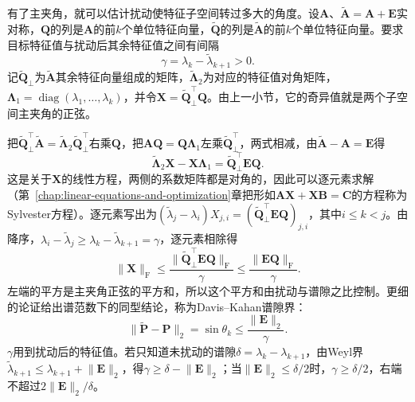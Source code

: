 有了主夹角，就可以估计扰动使特征子空间转过多大的角度。设$\bm A$、$\widetilde{\bm A}=\bm A+\bm E$实对称，$\bm Q$的列是$\bm A$的前$k$个单位特征向量，$\widetilde{\bm Q}$的列是$\widetilde{\bm A}$的前$k$个单位特征向量。要求目标特征值与扰动后其余特征值之间有间隔
\[
 \gamma=\lambda_k-\widetilde\lambda_{k+1}>0 .
\]
记$\widetilde{\bm Q}_\perp$为$\widetilde{\bm A}$其余特征向量组成的矩阵，$\widetilde{\bm\Lambda}_2$为对应的特征值对角矩阵，$\bm\Lambda_1=\operatorname{diag}(\lambda_1,\ldots,\lambda_k)$，并令$\bm X=\widetilde{\bm Q}_\perp^\top\bm Q$。由上一小节，它的奇异值就是两个子空间主夹角的正弦。

把$\widetilde{\bm Q}_\perp^\top\widetilde{\bm A}=\widetilde{\bm\Lambda}_2\widetilde{\bm Q}_\perp^\top$右乘$\bm Q$，把$\bm A\bm Q=\bm Q\bm\Lambda_1$左乘$\widetilde{\bm Q}_\perp^\top$，两式相减，由$\widetilde{\bm A}-\bm A=\bm E$得
\[
 \widetilde{\bm\Lambda}_2\bm X-\bm X\bm\Lambda_1=\widetilde{\bm Q}_\perp^\top\bm E\bm Q .
\]
这是关于$\bm X$的线性方程，两侧的系数矩阵都是对角的，因此可以逐元素求解（第~\ref{chap:linear-equations-and-optimization}章把形如$\bm A\bm X+\bm X\bm B=\bm C$的方程称为Sylvester方程）。逐元素写出为$(\widetilde\lambda_j-\lambda_i)X_{j,i}=(\widetilde{\bm Q}_\perp^\top\bm E\bm Q)_{j,i}$，其中$i\leq k<j$。由降序，$\lambda_i-\widetilde\lambda_j\geq\lambda_k-\widetilde\lambda_{k+1}=\gamma$，逐元素相除得
\[
 \lVert\bm X\rVert_{\mathrm F}\leq\frac{\lVert\widetilde{\bm Q}_\perp^\top\bm E\bm Q\rVert_{\mathrm F}}{\gamma}\leq\frac{\lVert\bm E\bm Q\rVert_{\mathrm F}}{\gamma}.
\]
左端的平方是主夹角正弦的平方和，所以这个平方和由扰动与谱隙之比控制。更细的论证给出谱范数下的同型结论，称为Davis--Kahan谱隙界：
\begin{equation}
 \lVert\widetilde{\bm P}-\bm P\rVert_2=\sin\theta_{k}
 \leq\frac{\lVert\bm E\rVert_2}{\gamma}.
 \label{eq:matrix-analysis-eigenvector-gap-bound}
\end{equation}
$\gamma$用到扰动后的特征值。若只知道未扰动的谱隙$\delta=\lambda_k-\lambda_{k+1}$，由Weyl界$\widetilde\lambda_{k+1}\leq\lambda_{k+1}+\lVert\bm E\rVert_2$，得$\gamma\geq\delta-\lVert\bm E\rVert_2$；当$\lVert\bm E\rVert_2\leq\delta/2$时，$\gamma\geq\delta/2$，右端不超过$2\lVert\bm E\rVert_2/\delta$。

